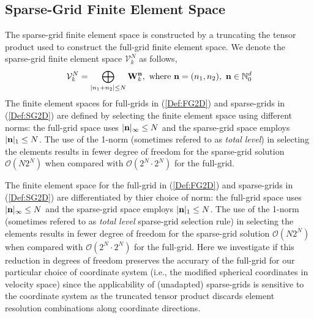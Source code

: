 \documentclass[preprint,11pt]{elsarticle}
\begin{document}
\subsection{Sparse-Grid Finite Element Space}
\label{sec:2d-fe-space}
The sparse-grid finite element space is constructed by a truncating the tensor product used to construct the full-grid finite element space. We denote the sparse-grid finite element space $\mathcal{V}^N_k$ as follows,
%
\begin{eqnarray}
\label{Def:SG2D}
\mathcal{V}_k^N=\bigoplus_{|n_1+n_2|\le N}{\bf W}_k^{\bf n}, \text{ where } {\bf n} = (n_1,n_2), \ {\bf n}\in\mathbb{N}_0^d
\end{eqnarray}
%
The finite element spaces for full-grids in (\ref{Def:FG2D}) and sparse-grids in (\ref{Def:SG2D}) are defined by selecting the finite element space using different norms: the full-grid space uses $|{\bf n}|_{\infty}\le N$ and the sparse-grid space employs $|{\bf n}|_1\le N$. The use of the 1-norm (sometimes refered to as {\it total level}) in selecting the elements results in fewer degree of freedom for the sparse-grid solution  $\mathcal{O}(N2^N)$ when compared with $\mathcal{O}(2^N\cdot 2^N)$ for the full-grid.

The finite element space for the full-grid in (\ref{Def:FG2D}) and sparse-grids in (\ref{Def:SG2D}) are differentiated by thier choice of norm: the full-grid space uses $|{\bf n}|_{\infty}\le N$ and the sparse-grid space employs $|{\bf n}|_1\le N$. The use of the 1-norm (sometimes refered to as {\it{total level}} sparse-grid selection rule) in selecting the elements results in fewer degree of freedom for the sparse-grid solution $\mathcal{O}(N2^N)$ when compared with $\mathcal{O}(2^N\cdot 2^N)$ for the full-grid. Here we investigate if this reduction in degrees of freedom preserves the accurary of the full-grid for our particular choice of coordinate system (i.e., the modified spherical coordinates in velocity space) since the applicability of (unadapted) sparse-grids is sensitive to the coordinate system as the truncated tensor product discards element resolution combinations along coordinate directions. 
\end{document}
